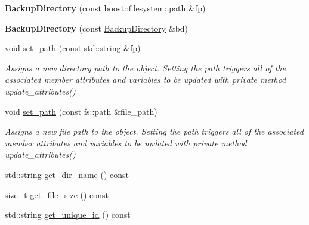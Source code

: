 \begin{DoxyCompactItemize}
\item 
\mbox{\label{class_vessel_1_1_file_1_1_backup_directory_a538c319573c9d0e600550303557f9d71}} 
{\bfseries Backup\+Directory} (const boost\+::filesystem\+::path \&fp)
\item 
\mbox{\label{class_vessel_1_1_file_1_1_backup_directory_a1e3b4f72745a95cad407eba687e92a1c}} 
{\bfseries Backup\+Directory} (const \hyperlink{class_vessel_1_1_file_1_1_backup_directory}{Backup\+Directory} \&bd)
\item 
\mbox{\label{class_vessel_1_1_file_1_1_backup_directory_a73d2cbf7874a46a70cec8ca338caf018}} 
void \hyperlink{class_vessel_1_1_file_1_1_backup_directory_a73d2cbf7874a46a70cec8ca338caf018}{set\+\_\+path} (const std\+::string \&fp)
\begin{DoxyCompactList}\small\item\em Assigns a new directory path to the object. Setting the path triggers all of the associated member attributes and variables to be updated with private method update\+\_\+attributes() \end{DoxyCompactList}\item 
\mbox{\label{class_vessel_1_1_file_1_1_backup_directory_a2a3283fa16689b65b32650c8586cd154}} 
void \hyperlink{class_vessel_1_1_file_1_1_backup_directory_a2a3283fa16689b65b32650c8586cd154}{set\+\_\+path} (const fs\+::path \&file\+\_\+path)
\begin{DoxyCompactList}\small\item\em Assigns a new file path to the object. Setting the path triggers all of the associated member attributes and variables to be updated with private method update\+\_\+attributes() \end{DoxyCompactList}\item 
std\+::string \hyperlink{class_vessel_1_1_file_1_1_backup_directory_a96fda7ffff230b4f3443bfee0dbfe10d}{get\+\_\+dir\+\_\+name} () const
\item 
size\+\_\+t \hyperlink{class_vessel_1_1_file_1_1_backup_directory_a98a43f679fd23b1b87eda1e817d5c244}{get\+\_\+file\+\_\+size} () const
\item 
std\+::string \hyperlink{class_vessel_1_1_file_1_1_backup_directory_af924ae419294ea1ceed5bf9ff13998ce}{get\+\_\+unique\+\_\+id} () const

\end{DoxyCompactItemize}
